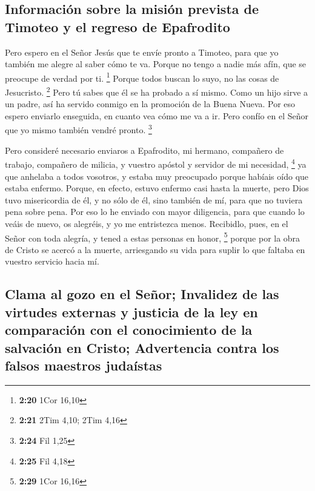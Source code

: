\hypertarget{informaciuxf3n-sobre-la-misiuxf3n-prevista-de-timoteo-y-el-regreso-de-epafrodito}{%
\subsection{Información sobre la misión prevista de Timoteo y el regreso
de
Epafrodito}\label{informaciuxf3n-sobre-la-misiuxf3n-prevista-de-timoteo-y-el-regreso-de-epafrodito}}

 Pero espero en el Señor Jesús que te envíe pronto a
Timoteo, para que yo también me alegre al saber cómo te va.
 Porque no tengo a nadie más afín, que se preocupe de
verdad por ti. \footnote{\textbf{2:20} 1Cor 16,10} 
Porque todos buscan lo suyo, no las cosas de Jesucristo. \footnote{\textbf{2:21}
  2Tim 4,10; 2Tim 4,16}  Pero tú sabes que él se ha
probado a sí mismo. Como un hijo sirve a un padre, así ha servido
conmigo en la promoción de la Buena Nueva.  Por eso
espero enviarlo enseguida, en cuanto vea cómo me va a ir.
 Pero confío en el Señor que yo mismo también vendré
pronto. \footnote{\textbf{2:24} Fil 1,25}

 Pero consideré necesario enviaros a Epafrodito, mi
hermano, compañero de trabajo, compañero de milicia, y vuestro apóstol y
servidor de mi necesidad, \footnote{\textbf{2:25} Fil 4,18}
 ya que anhelaba a todos vosotros, y estaba muy
preocupado porque habíais oído que estaba enfermo. 
Porque, en efecto, estuvo enfermo casi hasta la muerte, pero Dios tuvo
misericordia de él, y no sólo de él, sino también de mí, para que no
tuviera pena sobre pena.  Por eso lo he enviado con mayor
diligencia, para que cuando lo veáis de nuevo, os alegréis, y yo me
entristezca menos.  Recibidlo, pues, en el Señor con toda
alegría, y tened a estas personas en honor, \footnote{\textbf{2:29} 1Cor
  16,16}  porque por la obra de Cristo se acercó a la
muerte, arriesgando su vida para suplir lo que faltaba en vuestro
servicio hacia mí.

\hypertarget{clama-al-gozo-en-el-seuxf1or-invalidez-de-las-virtudes-externas-y-justicia-de-la-ley-en-comparaciuxf3n-con-el-conocimiento-de-la-salvaciuxf3n-en-cristo-advertencia-contra-los-falsos-maestros-judauxedstas}{%
\subsection{Clama al gozo en el Señor; Invalidez de las virtudes
externas y justicia de la ley en comparación con el conocimiento de la
salvación en Cristo; Advertencia contra los falsos maestros
judaístas}\label{clama-al-gozo-en-el-seuxf1or-invalidez-de-las-virtudes-externas-y-justicia-de-la-ley-en-comparaciuxf3n-con-el-conocimiento-de-la-salvaciuxf3n-en-cristo-advertencia-contra-los-falsos-maestros-judauxedstas}}

